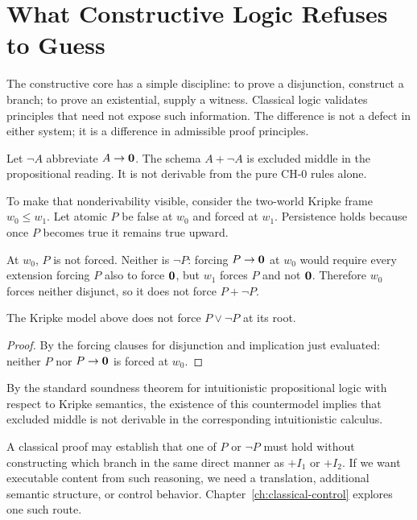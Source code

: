 \chapter{What Constructive Logic Refuses to Guess}
\label{ch:constructive-boundary}

The constructive core has a simple discipline: to prove a disjunction, construct a branch; to prove an existential, supply a witness. Classical logic validates principles that need not expose such information. The difference is not a defect in either system; it is a difference in admissible proof principles.

Let $\neg A$ abbreviate $A\to\mathbf{0}$. The schema $A+\neg A$ is excluded middle in the propositional reading. It is not derivable from the pure $\mathrm{CH}\text{-}0$ rules alone.



To make that nonderivability visible, consider the two-world Kripke frame $w_0\le w_1$. Let atomic $P$ be false at $w_0$ and forced at $w_1$. Persistence holds because once $P$ becomes true it remains true upward.

At $w_0$, $P$ is not forced. Neither is $\neg P$: forcing $P\to\mathbf{0}$ at $w_0$ would require every extension forcing $P$ also to force $\mathbf{0}$, but $w_1$ forces $P$ and not $\mathbf{0}$. Therefore $w_0$ forces neither disjunct, so it does not force $P+\neg P$.

\begin{proposition}
The Kripke model above does not force $P\lor\neg P$ at its root.
\end{proposition}
\begin{proof}
By the forcing clauses for disjunction and implication just evaluated: neither $P$ nor $P\to\mathbf{0}$ is forced at $w_0$.
\end{proof}

By the standard soundness theorem for intuitionistic propositional logic with respect to Kripke semantics, the existence of this countermodel implies that excluded middle is not derivable in the corresponding intuitionistic calculus.



\begin{workedexample}[title={Information not supplied}]
A classical proof may establish that one of $P$ or $\neg P$ must hold without constructing which branch in the same direct manner as $+I_1$ or $+I_2$. If we want executable content from such reasoning, we need a translation, additional semantic structure, or control behavior. Chapter~\ref{ch:classical-control} explores one such route.
\end{workedexample}

